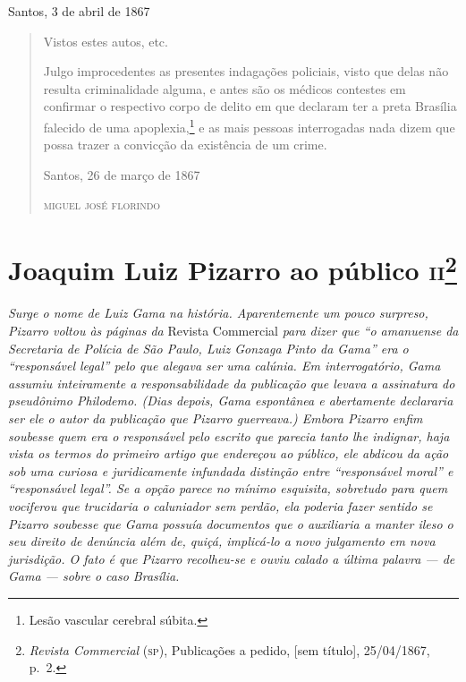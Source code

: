 \begin{flushright}
Santos, 3 de abril de 1867
\end{flushright}

\begin{quote}
Vistos estes autos, etc.

Julgo improcedentes as presentes indagações policiais, visto que delas
não resulta criminalidade alguma, e antes são os médicos contestes em
confirmar o respectivo corpo de delito em que declaram ter a preta
Brasília falecido de uma apoplexia,\footnote{ Lesão vascular cerebral
  súbita.} e as mais pessoas interrogadas nada dizem que possa trazer a
convicção da existência de um crime.

\begin{flushright}
Santos, 26 de março de 1867

\textsc{miguel josé florindo}
\end{flushright}
\end{quote}

\chapter{Joaquim Luiz Pizarro ao público \textsc{ii}\footnote{\emph{Revista Commercial} (\textsc{sp}), Publicações a pedido, {[}sem título{]}, 25/04/1867, p.~2.}}

\begin{didascalia}
\emph{Surge o nome de Luiz Gama na história. Aparentemente um pouco
surpreso, Pizarro voltou às páginas da} Revista Commercial \emph{para
dizer que ``o amanuense da Secretaria de Polícia de São Paulo, Luiz
Gonzaga Pinto da Gama'' era o ``responsável legal'' pelo que alegava ser
uma calúnia. Em interrogatório, Gama assumiu inteiramente a
responsabilidade da publicação que levava a assinatura do pseudônimo
Philodemo. (Dias depois, Gama espontânea e abertamente declararia ser
ele o autor da publicação que Pizarro guerreava.) Embora
Pizarro enfim soubesse quem era o responsável pelo escrito que parecia
tanto lhe indignar, haja vista os termos do primeiro artigo que
endereçou ao público, ele abdicou da ação sob uma curiosa e
juridicamente infundada distinção entre ``responsável moral'' e
``responsável legal''. Se a opção parece no mínimo esquisita, sobretudo
para quem vociferou que trucidaria o caluniador sem perdão, ela poderia
fazer sentido se Pizarro soubesse que Gama possuía documentos que o
auxiliaria a manter ileso o seu direito de denúncia além de, quiçá,
implicá-lo a novo julgamento em nova jurisdição. O fato é que Pizarro
recolheu-se e ouviu calado a última palavra --- de Gama --- sobre o caso
Brasília.}
\end{didascalia}



